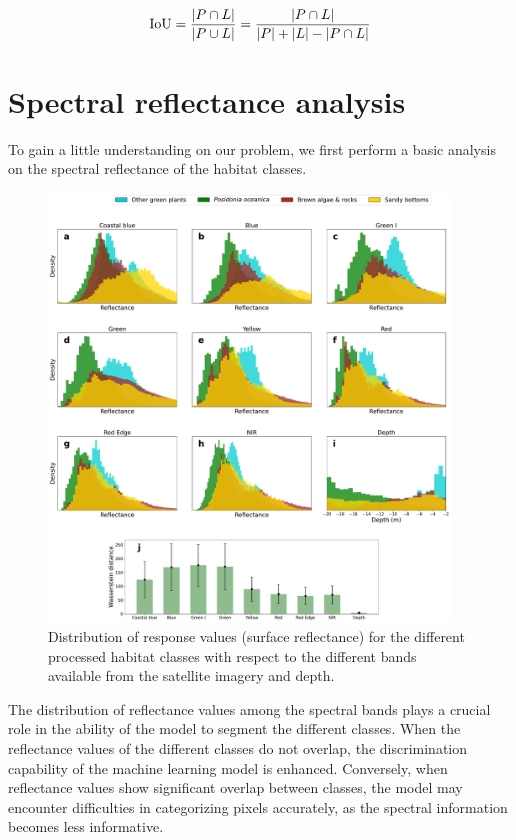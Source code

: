 \begin{equation*}
    \text{IoU} = \frac{\abs{P\cap L}}{\abs{P\cup L}}=\frac{\abs{P\cap
            L}}{\abs{P} + \abs{L} - \abs{P\cap L}}
\end{equation*}

\section{Spectral reflectance analysis}\label{app:spectral_reflectance}

To gain a little understanding on our problem, we first perform a basic
analysis on the spectral reflectance of the habitat classes.

\begin{figure}[H]
    \centering

    \includegraphics[width=0.95\textwidth]{Figures/Reflectance_histograms_Mallorca_only.pdf}
    \caption{Distribution of response values (surface reflectance) for the
        different processed habitat classes with respect to the different bands
        available from the satellite imagery and depth.}
    \label{fig:reflectance}
\end{figure}

The distribution of reflectance values among the spectral bands plays a crucial
role in the
ability of the model to segment the different classes. When the reflectance
values of the different classes do not overlap, the discrimination capability
of the machine learning model is enhanced. Conversely, when reflectance values
show significant overlap between classes, the model may encounter difficulties
in categorizing pixels accurately, as the spectral information becomes less
informative.


